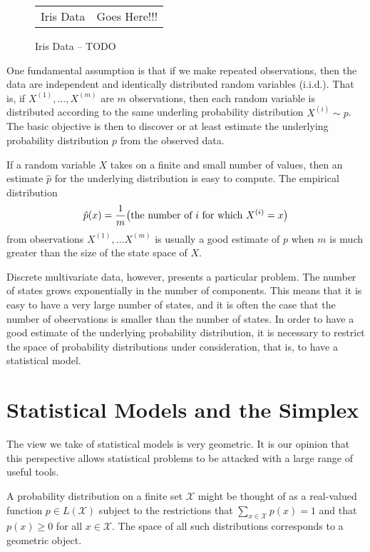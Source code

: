 \documentclass[cclicense]{hmcthesis}
\newcommand*{\x}[1]{\ensuremath{X^{(#1)}}}
\newcommand*{\xs}{\mathcal X}
\numberwithin{equation}{chapter}
\numberwithin{thmcounter}{chapter}
\begin{document}
    \begin{figure}[H]
    \centering
    \begin{tabular}{c c}
        Iris Data & Goes Here!!!
    \end{tabular}
    \caption{Iris Data -- TODO}
    \end{figure}

    One fundamental assumption is that if we make repeated observations, then
    the data are independent and identically distributed random variables
    (i.i.d.).  That is, if $\x 1, \ldots, \x m$ are $m$ observations, then each
    random variable is distributed according to the same underling probability
    distribution $\x i \sim p$.  The basic objective is then to discover or at
    least estimate the underlying probability distribution $p$ from the observed
    data.

    If a random variable $X$ takes on a finite and small number of values, then
    an estimate $\hat p$ for the underlying distribution is easy to compute.
    The empirical distribution
    \[
        \hat p(x) = \frac 1 m \pdel[\big]{\text{the number of $i$ for which $\x
        i = x$}}
    \]
    from observations $\x 1, \ldots \x m$ is usually a good estimate of $p$ when
    $m$ is much greater than the size of the state space of $X$.

    Discrete multivariate data, however, presents a particular problem.  The
    number of states grows exponentially in the number of components.  This
    means that it is easy to have a very large number of states, and it is often
    the case that the number of observations is smaller than the number of
    states.  In order to have a good estimate of the underlying probability
    distribution, it is necessary to restrict the space of probability
    distributions under consideration, that is, to have a statistical model.


    \section{Statistical Models and the Simplex}

    The view we take of statistical models is very geometric.  It is our opinion
    that this perspective allows statistical problems to be attacked with a
    large range of useful tools.

    A probability distribution on a finite set $\xs$ might be thought of as a
    real-valued function $p \in L(\xs)$ subject to the restrictions that
    $\sum_{x\in \xs} p(x) = 1$ and that $p(x) \ge 0$ for all $x \in \xs$.  The
    space of all such distributions corresponds to a geometric object.
    
\end{document}
